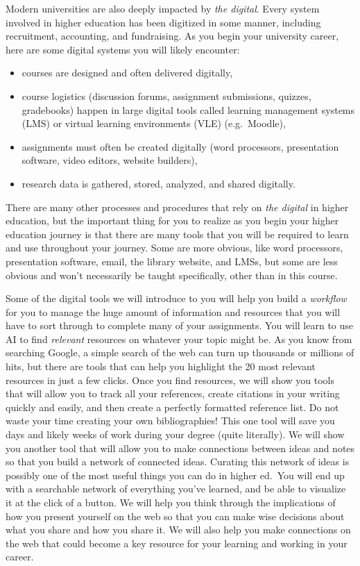 \documentclass[
]{book}
\providecommand{\tightlist}{%
  \setlength{\itemsep}{0pt}\setlength{\parskip}{0pt}}
\theoremstyle{definition}
\theoremstyle{definition}
\theoremstyle{definition}
\theoremstyle{definition}
\theoremstyle{remark}
\begin{document}
Modern universities are also deeply impacted by \emph{the digital}. Every system involved in higher education has been digitized in some manner, including recruitment, accounting, and fundraising. As you begin your university career, here are some digital systems you will likely encounter:

\begin{itemize}
\tightlist
\item
  courses are designed and often delivered digitally,
\item
  course logistics (discussion forums, assignment submissions, quizzes, gradebooks) happen in large digital tools called learning management systems (LMS) or virtual learning environments (VLE) (e.g.~Moodle),
\item
  assignments must often be created digitally (word processors, presentation software, video editors, website builders),
\item
  research data is gathered, stored, analyzed, and shared digitally.
\end{itemize}

There are many other processes and procedures that rely on \emph{the digital} in higher education, but the important thing for you to realize as you begin your higher education journey is that there are many tools that you will be required to learn and use throughout your journey. Some are more obvious, like word processors, presentation software, email, the library website, and LMSs, but some are less obvious and won't necessarily be taught specifically, other than in this course.

Some of the digital tools we will introduce to you will help you build a \emph{workflow} for you to manage the huge amount of information and resources that you will have to sort through to complete many of your assignments. You will learn to use AI to find \emph{relevant} resources on whatever your topic might be. As you know from searching Google, a simple search of the web can turn up thousands or millions of hits, but there are tools that can help you highlight the 20 most relevant resources in just a few clicks. Once you find resources, we will show you tools that will allow you to track all your references, create citations in your writing quickly and easily, and then create a perfectly formatted reference list. Do not waste your time creating your own bibliographies! This one tool will save you days and likely weeks of work during your degree (quite literally). We will show you another tool that will allow you to make connections between ideas and notes so that you build a network of connected ideas. Curating this network of ideas is possibly one of the most useful things you can do in higher ed.~You will end up with a searchable network of everything you've learned, and be able to visualize it at the click of a button. We will help you think through the implications of how you present yourself on the web so that you can make wise decisions about what you share and how you share it. We will also help you make connections on the web that could become a key resource for your learning and working in your career.
\end{document}
